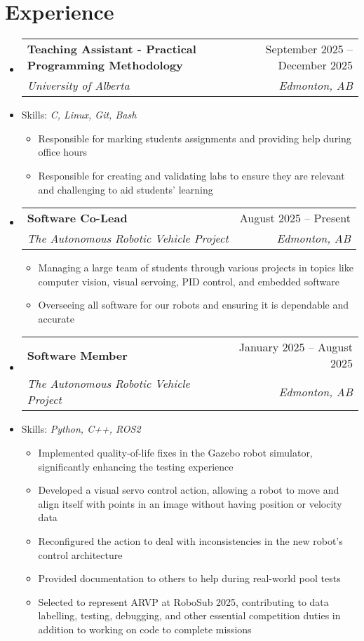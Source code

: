 \documentclass[letterpaper,11pt]{article}
\makeatletter
\newcommand{\resumeItem}[1]{
  \item\small{
    {#1 \vspace{-2pt}}
  }
}
\newcommand{\resumeSubheading}[4]{
  \vspace{-2pt}\item
    \begin{tabular*}{0.97\textwidth}[t]{l@{\extracolsep{\fill}}r}
      \textbf{#1} & #2 \\
      \textit{\small#3} & \textit{\small #4} \\
    \end{tabular*}\vspace{-7pt}
}
\newcommand{\resumeSubSubheading}[2]{
    \item
    \begin{tabular*}{0.97\textwidth}{l@{\extracolsep{\fill}}r}
      \textit{\small#1} & \textit{\small #2} \\
    \end{tabular*}\vspace{-7pt}
}
\newcommand{\resumeSubItem}[1]{\resumeItem{#1}\vspace{-4pt}}
\newcommand{\resumeSubHeadingListStart}{\begin{itemize}[leftmargin=0.15in, label={}]}
\newcommand{\resumeSubHeadingListEnd}{\end{itemize}}
\newcommand{\resumeItemListStart}{\begin{itemize}}
\newcommand{\resumeItemListEnd}{\end{itemize}\vspace{-5pt}}
\makeatother
\begin{document}
\section{Experience}	
  \resumeSubHeadingListStart
  	 \resumeSubheading
      {Teaching Assistant - Practical Programming Methodology}{September 2025 -- December 2025}
      {University of Alberta}{Edmonton, AB}
      \resumeSubItem{Skills: \emph{C, Linux, Git, Bash}}
      \resumeItemListStart
        \resumeItem{Responsible for marking students assignments and providing help during office hours}
        \resumeItem{Responsible for creating and validating labs to ensure they are relevant and challenging to aid students' learning}
      \resumeItemListEnd
  	\resumeSubheading
      {Software Co-Lead}{August 2025 -- Present}
      {The Autonomous Robotic Vehicle Project}{Edmonton, AB}
      \resumeItemListStart
        \resumeItem{Managing a large team of students through various projects in topics like computer vision, visual servoing, PID control, and embedded software}
        \resumeItem{Overseeing all software for our robots and ensuring it is dependable and accurate}
      \resumeItemListEnd
    \resumeSubheading
      {Software Member}{January 2025 -- August 2025}
      {The Autonomous Robotic Vehicle Project}{Edmonton, AB}
     \resumeSubItem{Skills: \emph{Python, C++, ROS2}}
      \resumeItemListStart
        \resumeItem{Implemented quality-of-life fixes in the Gazebo robot simulator, significantly enhancing the testing experience}
        \resumeItem{Developed a visual servo control action, allowing a robot to move and align itself with points in an image without having position or velocity data}
        \resumeItem{Reconfigured the action to deal with inconsistencies in the new robot's control architecture}
        \resumeItem{Provided documentation to others to help during real-world pool tests}
        \resumeItem{Selected to represent ARVP at RoboSub 2025, contributing to data labelling, testing, debugging, and other essential competition duties in addition to working on code to complete missions}
      \resumeItemListEnd
      

  \resumeSubHeadingListEnd

\end{document}
